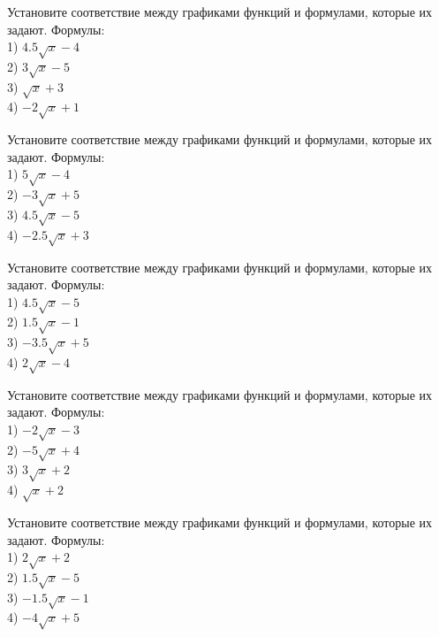 \documentclass[4apaper]{article}
\begin{document}
\begin{taskBN}{41}
Установите соответствие между графиками функций и формулами, которые их задают. Формулы: \\1) $4.5\sqrt{x}-4$\\2) $3\sqrt{x}-5$\\3) $\sqrt{x}+3$\\4) $-2\sqrt{x}+1$
\end{taskBN}

\begin{taskBN}{42}
Установите соответствие между графиками функций и формулами, которые их задают. Формулы: \\1) $5\sqrt{x}-4$\\2) $-3\sqrt{x}+5$\\3) $4.5\sqrt{x}-5$\\4) $-2.5\sqrt{x}+3$
\end{taskBN}

\begin{taskBN}{43}
Установите соответствие между графиками функций и формулами, которые их задают. Формулы: \\1) $4.5\sqrt{x}-5$\\2) $1.5\sqrt{x}-1$\\3) $-3.5\sqrt{x}+5$\\4) $2\sqrt{x}-4$
\end{taskBN}

\begin{taskBN}{44}
Установите соответствие между графиками функций и формулами, которые их задают. Формулы: \\1) $-2\sqrt{x}-3$\\2) $-5\sqrt{x}+4$\\3) $3\sqrt{x}+2$\\4) $\sqrt{x}+2$
\end{taskBN}

\begin{taskBN}{45}
Установите соответствие между графиками функций и формулами, которые их задают. Формулы: \\1) $2\sqrt{x}+2$\\2) $1.5\sqrt{x}-5$\\3) $-1.5\sqrt{x}-1$\\4) $-4\sqrt{x}+5$
\end{taskBN}
\end{document}
